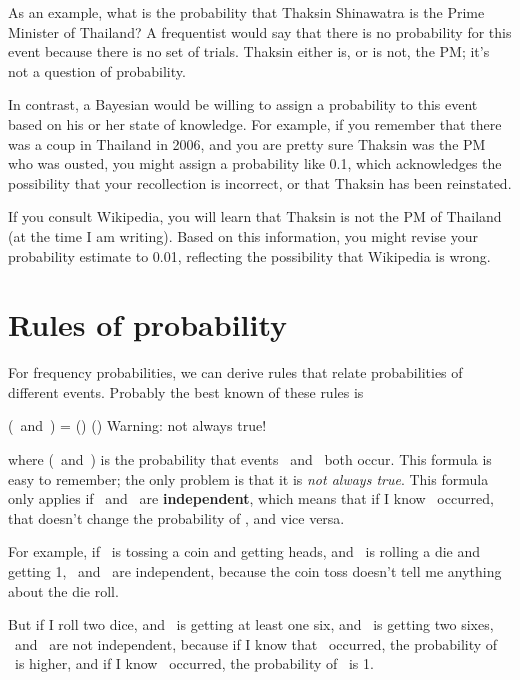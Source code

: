 \documentclass[12pt]{book}
\begin{document}
As an example, what is the probability that Thaksin Shinawatra is the
Prime Minister of Thailand?  A frequentist would say that there is no
probability for this event because there is no set of
trials.  Thaksin either is, or is not, the PM; it's not a question of
probability.

In contrast, a Bayesian would be willing to assign a probability to
this event based on his or her state of knowledge.  For example, if
you remember that there was a coup in Thailand in 2006, and you are
pretty sure Thaksin was the PM who was ousted, you might
assign a probability like 0.1, which acknowledges the possibility
that your recollection is incorrect, or that Thaksin has been
reinstated.

If you consult Wikipedia, you will learn that Thaksin is not the
PM of Thailand (at the time I am writing).  Based on this
information, you might revise your probability estimate to 0.01,
reflecting the possibility that Wikipedia is wrong.


\section{Rules of probability}

\newcommand{\AND}{~\mbox{and}~}

For frequency probabilities, we can derive rules that relate
probabilities of different events.  Probably the best known of these
rules is

\quad \Prob(\A \AND \B) = \Prob(\A) \Prob(\B) \quad Warning: not always true!

where \Prob(\A \AND \B) is the probability that events \A~and \B~both
occur.  This formula is easy to remember; the only problem is that it
is {\em not always true}.  This formula only applies if \A~and \B~are 
{\bf independent}, which means that if I know \A~occurred, that
doesn't change the probability of \B, and vice versa.

For example, if \A~is tossing a coin and getting heads, and \B~is 
rolling a die and getting 1, \A~and \B~are independent, because
the coin toss doesn't tell me anything about the die roll.

But if I roll two dice, and \A~is getting at least one six, and
\B~is getting two sixes, \A~and \B~are not independent, because
if I know that \A~occurred, the probability of \B~is higher, and
if I know \B~occurred, the probability of \A~is 1.
\end{document}
